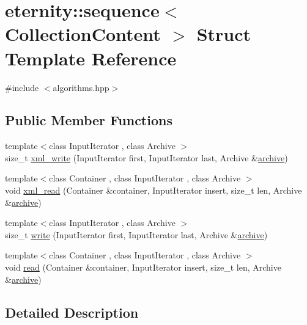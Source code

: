\hypertarget{structeternity_1_1sequence}{}\section{eternity\+:\+:sequence$<$ Collection\+Content $>$ Struct Template Reference}
\label{structeternity_1_1sequence}


{\ttfamily \#include $<$algorithms.\+hpp$>$}

\subsection*{Public Member Functions}
\begin{DoxyCompactItemize}
\item 
{\footnotesize template$<$class Input\+Iterator , class Archive $>$ }\\size\+\_\+t \hyperlink{structeternity_1_1sequence_a4e7cf210d285c8b3f72faa3d81ef9bad}{xml\+\_\+write} (Input\+Iterator first, Input\+Iterator last, Archive \&\hyperlink{classeternity_1_1archive}{archive})
\item 
{\footnotesize template$<$class Container , class Input\+Iterator , class Archive $>$ }\\void \hyperlink{structeternity_1_1sequence_ae510997cf3ed034443737ca0f05e9a34}{xml\+\_\+read} (Container \&container, Input\+Iterator insert, size\+\_\+t len, Archive \&\hyperlink{classeternity_1_1archive}{archive})
\item 
{\footnotesize template$<$class Input\+Iterator , class Archive $>$ }\\size\+\_\+t \hyperlink{structeternity_1_1sequence_a5339872e64fcb9636ef080e5b932658a}{write} (Input\+Iterator first, Input\+Iterator last, Archive \&\hyperlink{classeternity_1_1archive}{archive})
\item 
{\footnotesize template$<$class Container , class Input\+Iterator , class Archive $>$ }\\void \hyperlink{structeternity_1_1sequence_ac0bc259640bda1d30744b14c59539d20}{read} (Container \&container, Input\+Iterator insert, size\+\_\+t len, Archive \&\hyperlink{classeternity_1_1archive}{archive})
\end{DoxyCompactItemize}


\subsection{Detailed Description}
